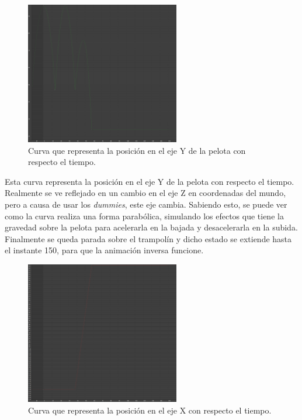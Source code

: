 \begin{figure}[H]
    \centering
    \includegraphics[width=0.6\textwidth]{imagenes/curvas/PL/pelota/green.png}
    \caption{Curva que representa la posición en el eje Y de la pelota con respecto el tiempo.}
\end{figure}

Esta curva representa la posición en el eje Y de la pelota con respecto el tiempo. Realmente se ve reflejado en un cambio en el eje Z en coordenadas del mundo, pero a causa de usar los \textit{dummies}, este eje cambia. Sabiendo esto, se puede ver como la curva realiza una forma parabólica, simulando los efectos que tiene la gravedad sobre la pelota para acelerarla en la bajada y desacelerarla en la subida. Finalmente se queda parada sobre el trampolín y dicho estado se extiende hasta el instante 150, para que la animación inversa funcione.

\begin{figure}[H]
    \centering
    \includegraphics[width=0.6\textwidth]{imagenes/curvas/PL/pelota/red.png}
    \caption{Curva que representa la posición en el eje X con respecto el tiempo.}
\end{figure}


